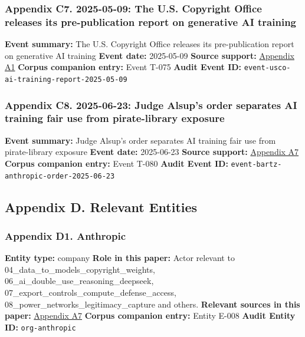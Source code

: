 \documentclass[
  american,
  11pt,
  letterpaper,
]{article}
\begin{document}
\subsubsection{Appendix C7. 2025-05-09: The U.S. Copyright Office
releases its pre-publication report on generative AI
training}\label{appendix-c7-2025-05-09-the-u-s-copyright-office-releases-its-pre-publication-report-on-generative-ai-training}

\textbf{Event summary:} The U.S. Copyright Office releases its
pre-publication report on generative AI training \textbf{Event date:}
2025-05-09 \textbf{Source support:}
\hyperref[appendix-a1-copyright-and-artificial-intelligence-part-3-generative-ai-training-pre-publication-version]{Appendix
A1} \textbf{Corpus companion entry:} Event T-075 \textbf{Audit Event
ID:} \texttt{event-usco-ai-training-report-2025-05-09}

\subsubsection{Appendix C8. 2025-06-23: Judge Alsup's order separates AI
training fair use from pirate-library
exposure}\label{appendix-c8-2025-06-23-judge-alsup-s-order-separates-ai-training-fair-use-from-pirate-library-exposure}

\textbf{Event summary:} Judge Alsup's order separates AI training fair
use from pirate-library exposure \textbf{Event date:} 2025-06-23
\textbf{Source support:}
\hyperref[appendix-a7-bartz-et-al-v-anthropic-pbc-order-on-fair-use]{Appendix
A7} \textbf{Corpus companion entry:} Event T-080 \textbf{Audit Event
ID:} \texttt{event-bartz-anthropic-order-2025-06-23}

\subsection{Appendix D. Relevant
Entities}\label{appendix-d.-relevant-entities}

\subsubsection{Appendix D1. Anthropic}\label{appendix-d1-anthropic}

\textbf{Entity type:} company \textbf{Role in this paper:} Actor
relevant to 04\_data\_to\_models\_copyright\_weights,
06\_ai\_double\_use\_reasoning\_deepseek,
07\_export\_controls\_compute\_defense\_access,
08\_power\_networks\_legitimacy\_capture and others. \textbf{Relevant
sources in this paper:}
\hyperref[appendix-a7-bartz-et-al-v-anthropic-pbc-order-on-fair-use]{Appendix
A7} \textbf{Corpus companion entry:} Entity E-008 \textbf{Audit Entity
ID:} \texttt{org-anthropic}
\end{document}
